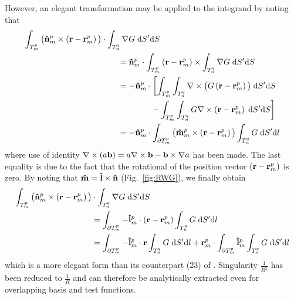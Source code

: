 %
\par
However, an elegant transformation may be applied to the integrand by noting that
\begin{equation}
\begin{split}
\int_{T_m^p} \big(\mathbf{\Hat{n}}_m^p \times \left(\mathbf{r}-\mathbf{r}_m^p \right) \big) &\cdot \int_{T_n^q} \nabla G \; \text{d} S' \text{d} S \\
&\qquad = \mathbf{\Hat{n}}_m^p \cdot \int_{T_m^p} \left(\mathbf{r}-\mathbf{r}_m^p \right) \times \int_{T_n^q} \nabla G \; \text{d} S' \text{d} S \\
&\qquad = - \mathbf{\Hat{n}}_m^p \cdot \left[ \int_{T_m^p} \int_{T_n^q} \nabla \times \big( G \left( \mathbf{r}-\mathbf{r}_m^p \right)\big) \; \text{d} S' \text{d} S \right. \\
& \qquad \qquad \qquad \left. - \int_{T_m^p} \int_{T_n^q} G \nabla \times \left( \mathbf{r}-\mathbf{r}_m^p \right) \; \text{d} S' \text{d} S\right] \\
&\qquad =  - \mathbf{\Hat{n}}_m^p \cdot \int_{\partial T_m^p} \big(\mathbf{\Hat{m}}_m^p \times  \left( \mathbf{r}-\mathbf{r}_m^p \right) \big) \int_{T_n^q}  G \; \text{d} S' \text{d} l 
\end{split}
\end{equation}
where use of identity $\nabla \times \left(a \mathbf{b}\right) = a \nabla \times \mathbf{b} - \mathbf{b} \times \nabla a$ has been made. The last equality is due to the fact that the rotational of the position vector $ \left( \mathbf{r}-\mathbf{r}_m^p \right)$ is zero. By noting that $\mathbf{\Hat{m}} = \mathbf{\Hat{l}} \times \mathbf{\Hat{n}}$ (Fig.\ \ref{fig:RWG}), we finally obtain
\begin{equation}
\begin{split}
\int_{T_m^p} \big(\mathbf{\Hat{n}}_m^p  \times \left(\mathbf{r}-\mathbf{r}_m^p \right) \big) &\cdot \int_{T_n^q} \nabla G \; \text{d} S' \text{d} S \\
& = \int_{\partial T_m^p} -\mathbf{\Hat{l}}_m^p \cdot  \left( \mathbf{r}-\mathbf{r}_m^p \right)  \int_{T_n^q}  G \; \text{d} S' \text{d} l \\
& = \int_{\partial T_m^p} -\mathbf{\Hat{l}}_m^p \cdot \mathbf{r}  \int_{T_n^q}  G \; \text{d} S' \text{d} l + \mathbf{r}_m^p \cdot \int_{\partial T_m^p}\mathbf{\Hat{l}}_m^p  \int_{T_n^q}  G \; \text{d} S' \text{d} l
\end{split}
\end{equation}
which is a more elegant form than its counterpart (23) of \cite{Taskinen_03}. Singularity $\frac{1}{R^2}$ has been reduced to $\frac{1}{R}$ and can therefore be analytically extracted even for overlapping basis and test functions. 

